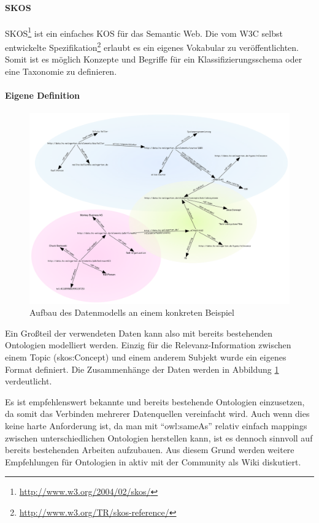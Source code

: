 \paragraph{SKOS}
\gls{SKOS}\footnote{\url{http://www.w3.org/2004/02/skos/}} ist ein einfaches \gls{KOS} für das Semantic Web.
Die vom W3C selbst entwickelte Spezifikation\footnote{\url{http://www.w3.org/TR/skos-reference/}} erlaubt es ein eigenes Vokabular zu veröffentlichten.
Somit ist es möglich Konzepte und Begriffe für ein Klassifizierungsschema oder eine Taxonomie zu definieren.

\paragraph{Eigene Definition}

\begin{figure}[htbp]
	\centering
	\includegraphics[scale=0.45,angle=90]{images/graph.pdf}
	\caption{Aufbau des Datenmodells an einem konkreten Beispiel}
	\label{example-graph}
\end{figure}

Ein Großteil der verwendeten Daten kann also mit bereits bestehenden Ontologien modelliert werden.
Einzig für die Relevanz-Information zwischen einem Topic (skos:Concept) und einem anderem Subjekt wurde ein eigenes Format definiert.
Die Zusammenhänge der Daten werden in Abbildung \ref{example-graph} verdeutlicht.

Es ist empfehlenswert bekannte und bereits bestehende Ontologien einzusetzen, da somit das Verbinden mehrerer Datenquellen vereinfacht wird.
Auch wenn dies keine harte Anforderung ist, da man mit ``owl:sameAs'' relativ einfach mappings zwischen unterschiedlichen Ontologien herstellen kann,
ist es dennoch sinnvoll auf bereits bestehenden Arbeiten aufzubauen.
Aus diesem Grund werden weitere Empfehlungen für Ontologien in \cite{ONTOPAT} aktiv mit der Community als Wiki diskutiert.
\newpage
